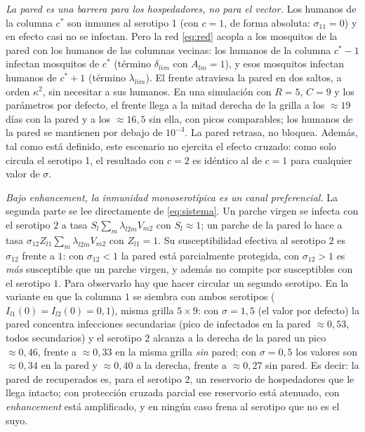 \documentclass{article}
\numberwithin{equation}{section}
\begin{document}
\emph{La pared es una barrera para los hospedadores, no para el vector.} Los humanos de la columna $c^\ast$ son inmunes al serotipo 1 (con $c=1$, de forma absoluta: $\sigma_{11}=0$) y en efecto casi no se infectan. Pero la red \eqref{eq:red} acopla a los mosquitos de la pared con los humanos de las columnas vecinas: los humanos de la columna $c^\ast-1$ infectan mosquitos de $c^\ast$ (término $\delta_{lim}$ con $A_{lm}=1$), y esos mosquitos infectan humanos de $c^\ast+1$ (término $\lambda_{lim}$). El frente atraviesa la pared en dos saltos, a orden $\kappa^2$, sin necesitar a sus humanos. En una simulación con $R=5$, $C=9$ y los parámetros por defecto, el frente llega a la mitad derecha de la grilla a los $\approx 19$ días con la pared y a los $\approx 16{,}5$ sin ella, con picos comparables; los humanos de la pared se mantienen por debajo de $10^{-3}$. La pared retrasa, no bloquea. Además, tal como está definido, este escenario no ejercita el efecto cruzado: como solo circula el serotipo 1, el resultado con $c=2$ es idéntico al de $c=1$ para cualquier valor de $\sigma$.

\emph{Bajo enhancement, la inmunidad monoserotípica es un canal preferencial.} La segunda parte se lee directamente de \eqref{eq:sistema}. Un parche virgen se infecta con el serotipo $2$ a tasa $S_l\sum_m\lambda_{l2m}V_{m2}$ con $S_l\approx 1$; un parche de la pared lo hace a tasa $\sigma_{12}Z_{l1}\sum_m\lambda_{l2m}V_{m2}$ con $Z_{l1}=1$. Su susceptibilidad efectiva al serotipo $2$ es $\sigma_{12}$ frente a $1$: con $\sigma_{12}<1$ la pared está parcialmente protegida, con $\sigma_{12}>1$ es \emph{más} susceptible que un parche virgen, y además no compite por susceptibles con el serotipo $1$. Para observarlo hay que hacer circular un segundo serotipo. En la variante en que la columna $1$ se siembra con ambos serotipos ($I_{l1}(0)=I_{l2}(0)=0{,}1$), misma grilla $5\times9$: con $\sigma=1{,}5$ (el valor por defecto) la pared concentra infecciones secundarias (pico de infectados en la pared $\approx 0{,}53$, todos secundarios) y el serotipo $2$ alcanza a la derecha de la pared un pico $\approx 0{,}46$, frente a $\approx 0{,}33$ en la misma grilla \emph{sin} pared; con $\sigma=0{,}5$ los valores son $\approx 0{,}34$ en la pared y $\approx 0{,}40$ a la derecha, frente a $\approx 0{,}27$ sin pared. Es decir: la pared de recuperados es, para el serotipo $2$, un reservorio de hospedadores que le llega intacto; con protección cruzada parcial ese reservorio está atenuado, con \emph{enhancement} está amplificado, y en ningún caso frena al serotipo que no es el suyo.
\end{document}
